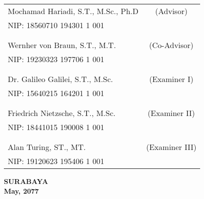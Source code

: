     \noindent
    \begin{tabularx}{\textwidth}{X c}
      Mochamad Hariadi, S.T., M.Sc., Ph.D          & (Advisor) \\
      NIP: 18560710 194301 1 001        & \\
      &  \\
      &  \\
      Wernher von Braun, S.T., M.T.     & (Co-Advisor) \\
      NIP: 19230323 197706 1 001        & \\
      &  \\
      &  \\
      Dr. Galileo Galilei, S.T., M.Sc.  & (Examiner I) \\
      NIP: 15640215 164201 1 001        & \\
      &  \\
      &  \\
      Friedrich Nietzsche, S.T., M.Sc.  & (Examiner II) \\
      NIP: 18441015 190008 1 001        & \\
      &  \\
      &  \\
      Alan Turing, ST., MT.             & (Examiner III) \\
      NIP: 19120623 195406 1 001        & \\
    \end{tabularx}
  \endgroup

  \vspace{4ex}

  \begin{center}
    \textbf{SURABAYA} \\
    \textbf{May, 2077}
  \end{center}
\endgroup
